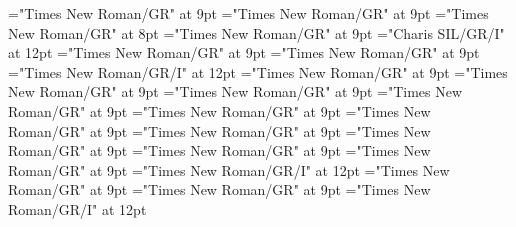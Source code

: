 \documentclass[gps1,twoside]{article}
\begin{document}
\font\spanspandefinitionorglosssensesensessensesensessubentrysubentriesentrybefore="Times New Roman/GR" at 9pt
\font\spandefinitionorglosssensesensessensesensessubentrysubentriesentrylastchildafter="Times New Roman/GR" at 9pt
\font\exampleexampleexamplessensesensessensesensessubentrysubentriesentrybefore="Times New Roman/GR" at 8pt
\font\examplessensesensessensesensessubentrysubentriesentryafter="Times New Roman/GR" at 9pt
\font\spanbzhexampleexampleexamplessensesensessensesensessubentrysubentriesentry="Charis SIL/GR/I" at 12pt
\font\spanspanexampleexampleexamplessensesensessensesensessubentrysubentriesentrybefore="Times New Roman/GR" at 9pt
\font\spanexampleexampleexamplessensesensessensesensessubentrysubentriesentrylastchildafter="Times New Roman/GR" at 9pt
\font\spanexampleexampleexamplessensesensessensesensessubentrysubentriesentry="Times New Roman/GR/I" at 12pt
\font\spanspantranslationtranslationtranslationsexampleexamplessensesensessensesensessubentrysubentriesentrybefore="Times New Roman/GR" at 9pt
\font\spantranslationtranslationtranslationsexampleexamplessensesensessensesensessubentrysubentriesentrylastchildafter="Times New Roman/GR" at 9pt
\font\spanspanencyclopedicinfosensesensessensesensessubentrysubentriesentrybefore="Times New Roman/GR" at 9pt
\font\spanencyclopedicinfosensesensessensesensessubentrysubentriesentryfirstchildbefore="Times New Roman/GR" at 9pt
\font\spanencyclopedicinfosensesensessensesensessubentrysubentriesentrylastchildafter="Times New Roman/GR" at 9pt
\font\spanspanrestrictionssensesensessensesensessubentrysubentriesentrybefore="Times New Roman/GR" at 9pt
\font\spanrestrictionssensesensessensesensessubentrysubentriesentryfirstchildbefore="Times New Roman/GR" at 9pt
\font\spanrestrictionssensesensessensesensessubentrysubentriesentrylastchildafter="Times New Roman/GR" at 9pt
\font\spanspanlexsensereferencessensesensessensesensessubentrysubentriesentrybefore="Times New Roman/GR" at 9pt
\font\lexsensereferencessensesensessensesensessubentrysubentriesentryafter="Times New Roman/GR" at 9pt
\font\spanenownertypeabbreviationlexsensereferencelexsensereferencessensesensessensesensessubentrysubentriesentry="Times New Roman/GR/I" at 12pt
\font\spanspanownertypeabbreviationlexsensereferencelexsensereferencessensesensessensesensessubentrysubentriesentrybefore="Times New Roman/GR" at 9pt
\font\spanownertypeabbreviationlexsensereferencelexsensereferencessensesensessensesensessubentrysubentriesentrylastchildafter="Times New Roman/GR" at 9pt
\font\spanownertypeabbreviationlexsensereferencelexsensereferencessensesensessensesensessubentrysubentriesentry="Times New Roman/GR/I" at 12pt
\end{document}
